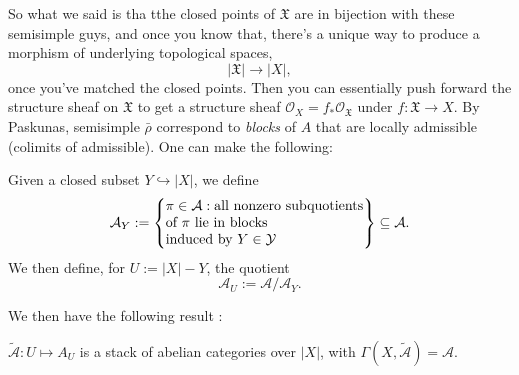 \documentclass[reqno]{amsart} 
\begin{document}
So what we said is tha tthe closed points of $\mathfrak{X}$ are in bijection with these semisimple guys, and once you know that, there's a unique way to produce a morphism of underlying topological spaces,
\begin{equation*}
  \lvert \mathfrak{X} \rvert \rightarrow \lvert X \rvert,
\end{equation*}
once you've matched the closed points.  Then you can essentially push forward the structure sheaf on $\mathfrak{X}$ to get a structure sheaf $\mathcal{O}_X = f_\ast \mathcal{O}_{\mathfrak{X}}$ under $f : \mathfrak{X} \rightarrow X$.  By Paskunas, semisimple $\bar{\rho}$ correspond to \emph{blocks} of $A$ that are locally admissible (colimits of admissible).  One can make the following:
\begin{definition}
  Given a closed subset $Y \hookrightarrow \lvert X \rvert$, we define
  \begin{equation*}
    \mathcal{A}_Y := \left\{
      \begin{array}{@{}l@{}}
        \pi \in \mathcal{A} : \text{all nonzero subquotients} \\
        \text{of $\pi$ lie in blocks} \\
        \text{induced by $Y \in \mathcal{Y}$}
      \end{array}
    \right\} \subseteq \mathcal{A}.
  \end{equation*}
  We then define, for $U := \lvert X \rvert - Y$, the quotient
  \begin{equation*}
    \mathcal{A}_U := \mathcal{A} / \mathcal{A}_Y.
  \end{equation*}
\end{definition}
We then have the following result \cite[Theorem 1.1.1]{2022arXiv2207.04671}:
\begin{theorem}[DEG]
  $\tilde{\mathcal{A}} : U \mapsto A_U$ is a stack of abelian categories over $\lvert X \rvert$, with $\Gamma(X, \tilde{\mathcal{A}}) = \mathcal{A}$.
\end{theorem}
\end{document}
